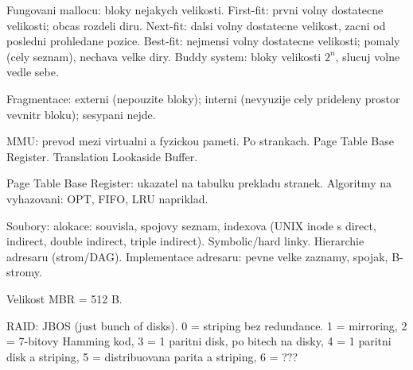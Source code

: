 Fungovani mallocu: bloky nejakych velikosti.
First-fit: prvni volny dostatecne velikosti; obcas rozdeli diru.
Next-fit: dalsi volny dostatecne velikost, zacni od posledni prohledane pozice.
Best-fit: nejmensi volny dostatecne velikosti; pomaly (cely seznam), nechava
velke diry.
Buddy system: bloky velikosti $2^n$, slucuj volne vedle sebe.

Fragmentace: externi (nepouzite bloky); interni (nevyuzije cely prideleny
prostor vevnitr bloku); sesypani nejde.

MMU: prevod mezi virtualni a fyzickou pameti.
Po strankach. Page Table Base Register.
Translation Lookaside Buffer.

Page Table Base Register: ukazatel na tabulku prekladu stranek.
Algoritmy na vyhazovani: OPT, FIFO, LRU napriklad.

Soubory: alokace: souvisla, spojovy seznam, indexova (UNIX inode s direct,
indirect, double indirect, triple indirect).
Symbolic/hard linky.
Hierarchie adresaru (strom/DAG).
Implementace adresaru: pevne velke zaznamy, spojak, B-stromy.

Velikost MBR = 512 B.

RAID: JBOS (just bunch of disks).
0 = striping bez redundance. 1 = mirroring, 2 = 7-bitovy Hamming kod,
3 = 1 paritni disk, po bitech na disky, 4 = 1 paritni disk a striping,
5 = distribuovana parita a striping, 6 = ???
